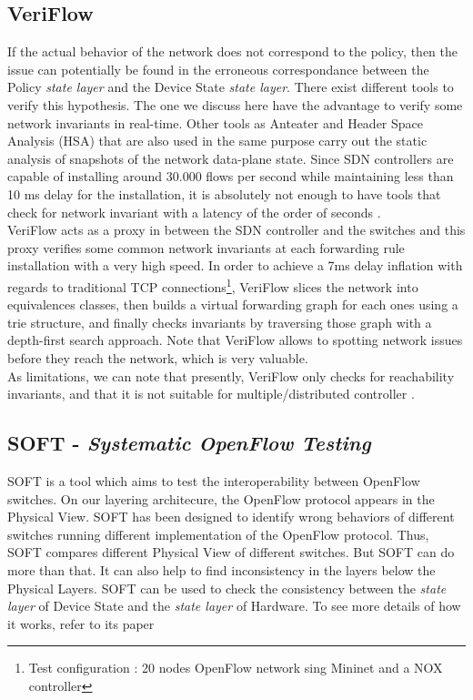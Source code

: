 \documentclass[10pt,article]{IEEEtran}
\begin{document}
\subsection{VeriFlow}
If the actual behavior of the network does not correspond to the policy, then the issue can potentially be found in the erroneous correspondance between the Policy \textit{state layer} and the Device State \textit{state layer}. There exist different tools to verify this hypothesis. The one we discuss here have the advantage to verify some network invariants in real-time. Other tools as Anteater and Header Space Analysis (HSA) that are also used in the same purpose carry out the static analysis of snapshots of the network data-plane state\cite{Kazemian:2012:HSA:2228298.2228311}\cite{Mai:2011:DDP:2018436.2018470}. Since SDN controllers are capable of installing around 30.000 flows per second while maintaining less than 10 ms delay for the installation, it is absolutely not enough to have tools that check for network invariant with a latency of the order of seconds \cite{Khurshid:2013:VVN:2482626.2482630}.\\
VeriFlow acts as a proxy in between the SDN controller and the switches and this proxy verifies some common network invariants at each forwarding rule installation with a very high speed. In order to achieve a 7ms delay inflation with regards to traditional TCP connections\footnote{Test configuration : 20 nodes OpenFlow network sing Mininet and a NOX controller\cite{Khurshid:2013:VVN:2482626.2482630} }, VeriFlow slices the network into equivalences classes, then builds a virtual forwarding graph for each ones using a trie structure, and finally checks invariants by traversing those graph with a depth-first search approach. Note that VeriFlow allows to spotting network issues before they reach the network, which is very valuable.\\
As limitations, we can note that presently, VeriFlow only checks for reachability invariants, and that it is not suitable for multiple/distributed controller \cite{Khurshid:2013:VVN:2482626.2482630}.

\subsection{SOFT - \textit{Systematic OpenFlow Testing}}
SOFT is a tool which aims to test the interoperability between OpenFlow switches. On our layering architecure, the OpenFlow protocol appears in the Physical View. SOFT has been designed to identify wrong behaviors of different switches running different implementation of the OpenFlow protocol. Thus, SOFT compares different Physical View of different switches. But SOFT can do more than that. It can also help to find inconsistency in the layers below the Physical Layers. SOFT can be used to check the consistency between the \textit{state layer} of Device State and the \textit{state layer} of Hardware. To see more details of how it works, refer to its paper \cite{SOFT}
\end{document}
